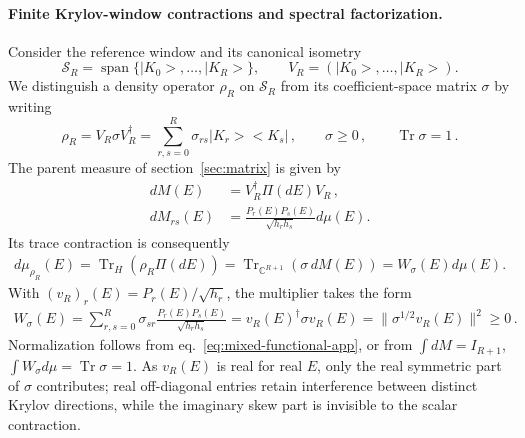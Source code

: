 \documentclass[a4paper,11pt]{article}
\def\ket#1{|#1>}%
\def\bra#1{<#1|}%
\def\dd{d}%
\def\cH{H}%
\theoremstyle{definition}
\theoremstyle{remark}
\newcommand{\ket}[1]{|#1\rangle}
\newcommand{\bra}[1]{\langle #1|}
\newcommand{\dd}{\mathrm d}
\newcommand{\CC}{\mathbb C}
\newcommand{\cH}{\mathcal H}
\newcommand{\Span}{\operatorname{span}}
\begin{document}
\paragraph{Finite Krylov-window contractions and spectral factorization.}
Consider the reference window and its canonical isometry
\begin{equation}
   \mathcal S_R=\Span\{\ket{K_0},\ldots,\ket{K_R}\},
   \qquad
   V_R=(\ket{K_0},\ldots,\ket{K_R}).
\end{equation}
We distinguish a density operator $\rho_R$ on $\mathcal S_R$ from its
coefficient-space matrix $\sigma$ by writing
\begin{equation}
   \rho_R=V_R\sigma V_R^\dagger
   =\sum_{r,s=0}^{R}\sigma_{rs}\ket{K_r}\bra{K_s}\,,
   \qquad
   \sigma\ge0\,,\qquad \operatorname{Tr}\sigma=1\,.
   \label{eq:mixed-window-density-app}
\end{equation}
The parent measure of section~\ref{sec:matrix} is given by
\begin{equation}
\begin{aligned}
   \dd M(E)&=V_R^\dagger\Pi(\dd E)V_R\,,\\
   \dd M_{rs}(E)
   &=\frac{P_r(E)P_s(E)}{\sqrt{h_rh_s}}\dd\mu(E).
\end{aligned}
   \label{eq:mixed-parent-measure-app}
\end{equation}
Its trace contraction is consequently 
\begin{equation}
\begin{aligned}
   \dd\mu_{\rho_R}(E)
   =\operatorname{Tr}_{\cH}\!\left(\rho_R\Pi(\dd E)\right)
   =\operatorname{Tr}_{\CC^{R+1}}\!\left(\sigma\,\dd M(E)\right)
   =W_\sigma(E)\dd\mu(E).
\end{aligned}
   \label{eq:mixed-parent-compression-app}
\end{equation}
With $(v_R)_r(E)=P_r(E)/\sqrt{h_r}$, the multiplier takes the form
\begin{equation}
\begin{aligned}
   W_\sigma(E)
   =\sum_{r,s=0}^{R}\sigma_{sr}
     \frac{P_r(E)P_s(E)}{\sqrt{h_rh_s}}
   =v_R(E)^\dagger\sigma v_R(E)
   =\|\sigma^{1/2}v_R(E)\|^2\ge0\,.
\end{aligned}
   \label{eq:mixed-window-weight-app}
\end{equation}
Normalization follows  from eq.~\eqref{eq:mixed-functional-app}, or from $\int\dd M=I_{R+1}$, $\int W_\sigma\dd\mu=\operatorname{Tr}\sigma=1$. As $v_R(E)$ is real for real $E$, only the real symmetric part of $\sigma$ contributes; real off-diagonal entries retain interference between distinct Krylov directions, while the imaginary skew part is invisible to the scalar contraction.
\end{document}

